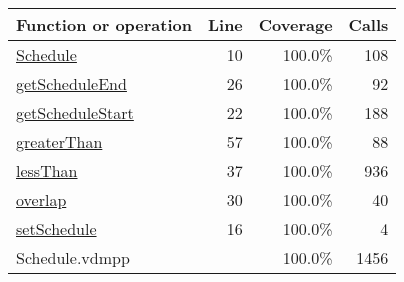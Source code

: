 \bigskip
\begin{longtable}{|l|r|r|r|}
\hline
Function or operation & Line & Coverage & Calls \\
\hline
\hline
\hyperref[Schedule:10]{Schedule} & 10&100.0\% & 108 \\
\hline
\hyperref[getScheduleEnd:26]{getScheduleEnd} & 26&100.0\% & 92 \\
\hline
\hyperref[getScheduleStart:22]{getScheduleStart} & 22&100.0\% & 188 \\
\hline
\hyperref[greaterThan:57]{greaterThan} & 57&100.0\% & 88 \\
\hline
\hyperref[lessThan:37]{lessThan} & 37&100.0\% & 936 \\
\hline
\hyperref[overlap:30]{overlap} & 30&100.0\% & 40 \\
\hline
\hyperref[setSchedule:16]{setSchedule} & 16&100.0\% & 4 \\
\hline
\hline
Schedule.vdmpp & & 100.0\% & 1456 \\
\hline
\end{longtable}

